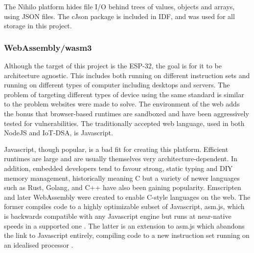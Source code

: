 \documentclass{article}
\begin{document}
The Nihilo platform hides file I/O behind trees of values, objects and arrays, using JSON files.
The cJson package is included in IDF, and was used for all storage in this project.

\subsubsection{WebAssembly/wasm3}

Although the target of this project is the ESP-32, the goal is for it to be architecture agnostic.
This includes both running on different instruction sets and running on different types of computer including desktops and servers.
The problem of targeting different types of device using the same standard is similar to the problem websites were made to solve.
The environment of the web adds the bonus that browser-based runtimes are sandboxed and have been aggressively tested for vulnerabilities.
The traditionally accepted web language, used in both NodeJS and IoT-DSA, is Javascript.

Javascript, though popular, is a bad fit for creating this platform.
Efficient runtimes are large and are usually themselves very architecture-dependent.
In addition, embedded developers tend to favour strong, static typing and DIY memory management, historically meaning C but a variety of newer languages such as Rust, Golang, and C++ have also been gaining popularity.
Emscripten and later WebAssembly were created to enable C-style languages on the web.
The former compiles code to a highly optimizable subset of Javascript, asm.js, which is backwards compatible with any Javascript engine but runs at near-native speeds in a supported one \cite{asm}.
The latter is an extension to asm.js which abandons the link to Javascript entirely, compiling code to a new instruction set running on an idealised processor \cite{wasm}.
\end{document}
